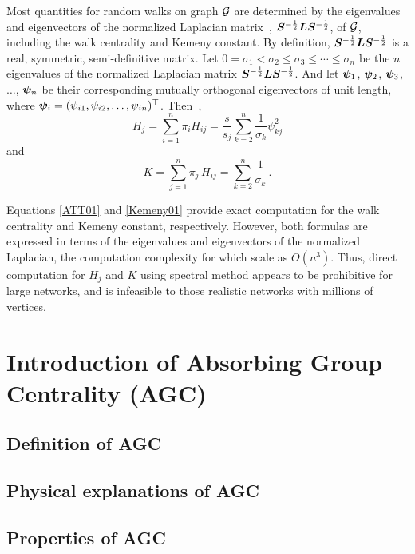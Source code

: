 \documentclass[journal]{IEEEtran}
\begin{document}
Most quantities for random walks on graph \(\mathcal{G}\) are determined by the eigenvalues and eigenvectors of the normalized Laplacian matrix~\cite{Ch97}, \({\boldsymbol{S}}^{-\frac{1}{2}}\boldsymbol{L} {\boldsymbol{S}}^{-\frac{1}{2}}\), of \(\mathcal{G}\), including the walk centrality and Kemeny constant. By definition, \({\boldsymbol{S}}^{-\frac{1}{2}}\boldsymbol{L} {\boldsymbol{S}}^{-\frac{1}{2}}\) is a real, symmetric, semi-definitive matrix. Let \(0=\sigma_1 < \sigma_2 \leq \sigma_3 \leq \cdots \leq \sigma_n \) be the \(n\) eigenvalues of the normalized Laplacian matrix \({\boldsymbol{S}}^{-\frac{1}{2}}\boldsymbol{L} {\boldsymbol{S}}^{-\frac{1}{2}}\). And let \(\boldsymbol{\psi}_1\), \(\boldsymbol{\psi}_2\), \(\boldsymbol{\psi}_3\), \(\ldots\), \(\boldsymbol{\psi}_n\) be their corresponding mutually orthogonal eigenvectors of unit length, where \(\boldsymbol{\psi}_i=(\psi_{i1},\psi_{i2},\ldots,\psi_{in})^{\top}\). Then~\cite{Lo93,Be16},
\begin{equation}\label{ATT01}
    H_j=\sum_{i=1}^{n} \pi_i H_{ij}=\frac{s}{s_j}\sum_{k=2}^{n}\frac{1}{\sigma_{k}}\psi_{kj}^{2}
\end{equation}
and
\begin{equation}\label{Kemeny01}
    K =\sum_{j=1}^{n}\pi_j\,H_{ij} =\sum_{k=2}^{n}\frac{1}{\sigma_{k}}\,.
\end{equation}

Equations \eqref{ATT01} and \eqref{Kemeny01} provide exact computation for the walk centrality and Kemeny constant, respectively. However, both formulas are expressed in terms of  the eigenvalues and eigenvectors of the normalized Laplacian, the computation complexity for which scale as \(O(n^3)\). Thus, direct  computation for \(H_j\) and \(K\)  using spectral method appears to be prohibitive for large networks, and is  infeasible  to those realistic networks with millions of vertices.

\section{Introduction of Absorbing Group Centrality (AGC)}

\subsection{Definition of AGC}

\subsection{Physical explanations of AGC}

\subsection{Properties of AGC}
\end{document}
